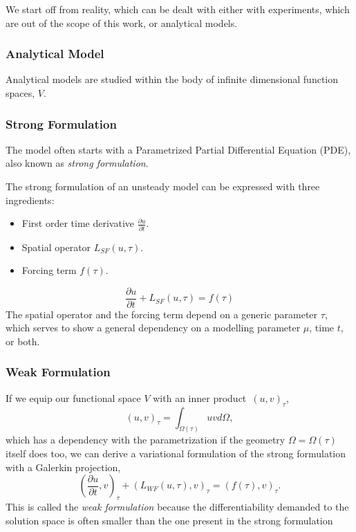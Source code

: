 \documentclass[../main.tex]{subfiles}
\begin{document}
We start off from reality, which can be dealt with either with experiments, which are out of the scope of this work, or analytical models.

\subsubsection{Analytical Model}
Analytical models are studied within the body of infinite dimensional function spaces, $V$.

\subsubsection*{Strong Formulation}
The model often starts with a Parametrized Partial Differential Equation (PDE), also known as \textit{strong formulation}.

The strong formulation of an unsteady model can be expressed with three ingredients:
\begin{itemize}
    \item First order time derivative $\frac{\partial u}{\partial t}$.
    \item Spatial operator $L_{SF}(u, \tau)$.
    \item Forcing term $f(\tau)$.
\end{itemize}
\begin{equation*}
    \frac{\partial u}{\partial t} + L_{SF}(u, \tau) = f(\tau)
\end{equation*}
The spatial operator and the forcing term depend on a generic parameter $\tau$, which serves to show a general dependency on a modelling parameter $\mu$, time $t$, or both.

\subsubsection*{Weak Formulation}
If we equip our functional space $V$ with an inner product~$(u,v)_\tau$,
\begin{equation*}
    (u,v)_\tau = \int_{\Omega(\tau)} u v d\Omega,
\end{equation*}
which has a dependency with the parametrization if the geometry $\Omega = \Omega(\tau)$ itself does too,
we can derive a variational formulation of the strong formulation with a Galerkin projection,
\begin{equation*}
    \left(\frac{\partial u}{\partial t}, v \right)_{\tau} + \left(L_{WF}(u, \tau), v \right)_{\tau} = \left(f(\tau), v \right)_{\tau}.
\end{equation*}
This is called the \textit{weak formulation} because the differentiability demanded to the solution space is often smaller than the one present in the strong formulation
\end{document}
